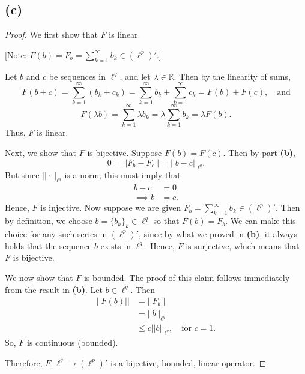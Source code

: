 \documentclass{article}
\begin{document}
\subsection*{(c)}
\begin{proof}
	We first show that $F$ is linear.
	
	[Note: $F(b) = F_b = \sum_{k=1}^{\infty}b_k \in \left(\ell^p\right)'$.]
	
	Let $b$ and $c$ be sequences in $\ell^q$, and let $\lambda \in \mathbb{K}$. Then by the linearity of sums,
	\begin{equation}
		F(b+c) = \sum_{k=1}^{\infty}(b_k + c_k) = \sum_{k=1}^{\infty}b_k + \sum_{k=1}^{\infty}c_k = F(b) + F(c), \quad \textrm{and}
	\end{equation}
	\begin{equation}
		F(\lambda b) = \sum_{k=1}^{\infty} \lambda b_k = \lambda \sum_{k=1}^{\infty}b_k = \lambda F(b).
	\end{equation}
	Thus, $F$ is linear. 
	
	Next, we show that $F$ is bijective. Suppose $F(b)=F(c)$. Then by part \textbf{(b)},
	\begin{equation}
		0 = ||F_b - F_c|| = ||b-c||_{\ell^q}.
	\end{equation}
	But since $||\cdot||_{\ell^q}$ is a norm, this must imply that 
	\begin{align}
		b-c&=0 \\
		\implies b&=c.
	\end{align}
	Hence, $F$ is injective. Now suppose we are given $F_b=\sum_{k=1}^{\infty}b_k\in \left(\ell^p\right)'$. Then by definition, we choose $b=\{b_k\}_k\in\ell^q$ so that $F(b) = F_b$. We can make this choice for any such series in $\left(\ell^p\right)'$, since by what we proved in \textbf{(b)}, it always holds that the sequence $b$ exists in $\ell^q$. Hence, $F$ is surjective, which means that $F$ is bijective. 
	
	We now show that $F$ is bounded. The proof of this claim follows immediately from the result in \textbf{(b)}. Let $b\in\ell^q$. Then
	\begin{align}
		||F(b)|| &= ||F_b|| \\
		&=||b||_{\ell^q} \\
		&\leq c||b||_{\ell^q}, \quad \textrm{for } c=1.
	\end{align}
	So, $F$ is continuous (bounded).
	
	Therefore, $F: \ell^q \rightarrow \left(\ell^p\right)'$ is a bijective, bounded, linear operator. 
\end{proof}
\end{document}
